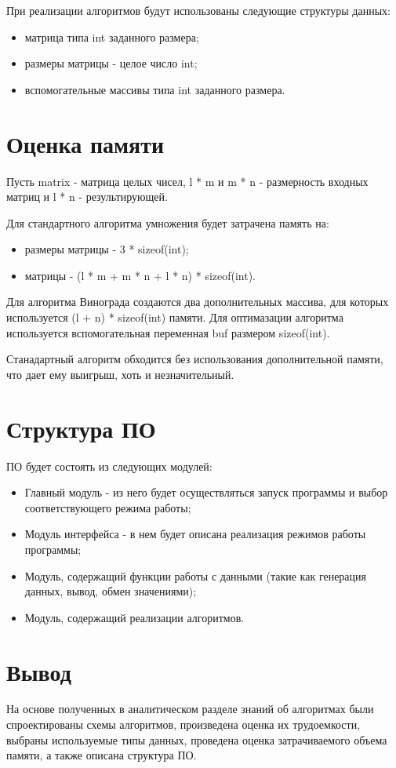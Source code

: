 При реализации алгоритмов будут использованы следующие структуры данных:
\begin{itemize}
	\item матрица типа int заданного размера;
	\item размеры матрицы - целое число int;
	\item вспомогательные массивы типа int заданного размера.
\end{itemize}

\section{Оценка памяти}

Пусть matrix - матрица целых чисел, l * m и m * n - размерность входных матриц и l * n - результирующей.

Для стандартного алгоритма умножения будет затрачена память на:
\begin{itemize}
	\item размеры матрицы - 3 * sizeof(int);
	\item матрицы - (l * m + m * n + l * n) * sizeof(int).
\end{itemize}

Для алгоритма Винограда создаются два дополнительных массива, для которых используется (l + n) * sizeof(int) памяти. Для оптимазации алгоритма используется вспомогательная переменная buf размером sizeof(int).

Станадартный алгоритм обходится без использования дополнительной памяти, что дает ему выигрыш, хоть и незначительный.

\section{Структура ПО}

ПО будет состоять из следующих модулей:
\begin{itemize}
	\item Главный модуль - из него будет осуществляться запуск программы и выбор соответствующего режима работы;
	\item Модуль интерфейса - в нем будет описана реализация режимов работы программы;
	\item Модуль, содержащий функции работы с данными (такие как генерация данных, вывод, обмен значениями);
	\item Модуль, содержащий реализации алгоритмов.
\end{itemize}

\section{Вывод}

На основе полученных в аналитическом разделе знаний об алгоритмах были спроектированы схемы алгоритмов, произведена оценка их трудоемкости, выбраны используемые типы данных, проведена оценка затрачиваемого объема памяти, а также описана структура ПО.